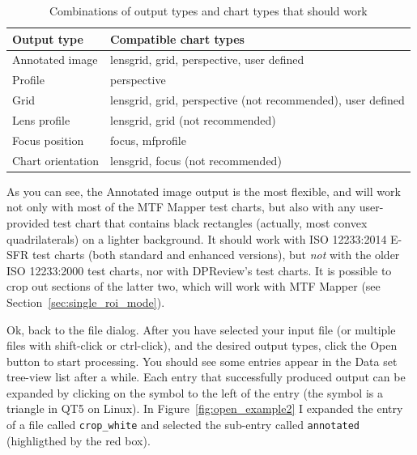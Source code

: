 \documentclass[a4paper]{article}
\begin{document}
\begin{table}[hb!]
\centering
\caption{Combinations of output types and chart types that should work}
\label{tab:combos}
\begin{tabular}{lp{10cm}}
\toprule
\bf Output type & \bf Compatible chart types \\
\midrule
Annotated image & lensgrid, grid, perspective, user defined \\
Profile         & perspective \\
Grid            & lensgrid, grid, perspective (not recommended), user defined \\
Lens profile    & lensgrid, grid (not recommended) \\
Focus position  & focus, mfprofile \\
Chart orientation & lensgrid, focus (not recommended) \\
\bottomrule
\end{tabular}
\end{table}

As you can see, the \textsf{Annotated image} output is the most flexible,
and will work not only with most of the MTF Mapper test charts, but also
with any user-provided test chart that contains black rectangles (actually,
most convex quadrilaterals) on a lighter background. It should work with ISO 12233:2014
E-SFR test charts (both standard and enhanced versions), but \emph{not} with
the older ISO 12233:2000 test charts, nor with DPReview's test charts. It is
possible to crop out sections of the latter two, which will work with MTF
Mapper (see Section~\ref{sec:single_roi_mode}).

\newpage

Ok, back to the file dialog. After you have selected your input file (or
multiple files with shift-click or ctrl-click), and
the desired output types, click the \textsf{Open} button to start
processing. You should see some entries appear in the \textsf{Data set}
tree-view list after a while. Each entry that successfully produced output
can be expanded by clicking on the symbol to the left of the entry (the
symbol is a triangle in QT5 on Linux). In Figure~\ref{fig:open_example2} I
expanded the entry of a file called \texttt{crop\_white} and selected the sub-entry
called \texttt{annotated} (highligthed by the red box).
\end{document}
